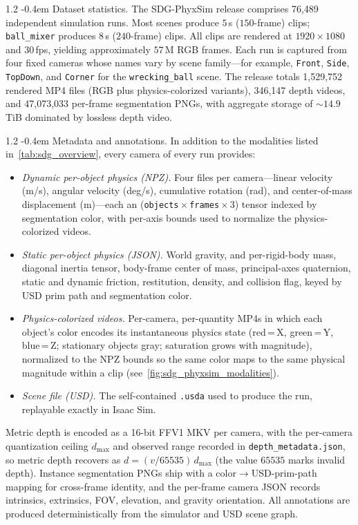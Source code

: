 \documentclass{llmxive}
\makeatletter
\providecommand{\paragraph}{  \@startsection{paragraph}{4}{\z@}    {1\baselineskip \@plus .2\baselineskip}    {-0.4em}    {\normalfont\normalsize\bfseries}}
\makeatother
\begin{document}
\paragraph{Dataset statistics.}
\label{appendix:sdg_phyxsim_dataset_statistics}
The SDG-PhyxSim release comprises 76{,}489 independent simulation
runs. Most scenes produce $5$\,s ($150$-frame) clips; \texttt{ball\_mixer}
produces $8$\,s ($240$-frame) clips. All clips are rendered at
$1920{\times}1080$ and $30$\,fps, yielding approximately $57$\,M RGB frames.
Each run is captured from four fixed cameras whose names vary by scene
family---for example, \texttt{Front}, \texttt{Side}, \texttt{TopDown},
and \texttt{Corner} for the \texttt{wrecking\_ball} scene. The release totals 1{,}529{,}752 rendered MP4 files (RGB plus
physics-colorized variants), 346{,}147 depth videos, and
47{,}073{,}033 per-frame segmentation PNGs, with aggregate storage of
${\sim}14.9$\,TiB dominated by lossless depth video.

\paragraph{Metadata and annotations.}
\label{appendix:sdg_phyxsim_metadata_annotations}
In addition to the modalities listed in~\cref{tab:sdg_overview}, every camera of every run provides:
\begin{itemize}
    \item \textit{Dynamic per-object physics (NPZ).} Four files per camera---linear velocity (m/s), angular velocity (deg/s), cumulative rotation (rad), and center-of-mass displacement (m)---each an (\texttt{objects}\,$\times$\,\texttt{frames}\,$\times$\,$3$) tensor indexed by segmentation color, with per-axis bounds used to normalize the physics-colorized videos.
    \item \textit{Static per-object physics (JSON).} World gravity, and per-rigid-body mass, diagonal inertia tensor, body-frame center of mass, principal-axes quaternion, static and dynamic friction, restitution, density, and collision flag, keyed by USD prim path and segmentation color.
    \item \textit{Physics-colorized videos.} Per-camera, per-quantity MP4s in which each object's color encodes its instantaneous physics state (red\,=\,X, green\,=\,Y, blue\,=\,Z; stationary objects gray; saturation grows with magnitude), normalized to the NPZ bounds so the same color maps to the same physical magnitude within a clip (see~\cref{fig:sdg_phyxsim_modalities}).
    \item \textit{Scene file (USD).} The self-contained \texttt{.usda} used to produce the run, replayable exactly in Isaac Sim.
\end{itemize}
Metric depth is encoded as a 16-bit FFV1 MKV per camera, with the per-camera quantization ceiling $d_{\max}$ and observed range recorded in \texttt{depth\_metadata.json}, so metric depth recovers as $d = (v/65535)\,d_{\max}$ (the value $65535$ marks invalid depth). Instance segmentation PNGs ship with a color$\rightarrow$USD-prim-path mapping for cross-frame identity, and the per-frame camera JSON records intrinsics, extrinsics, FOV, elevation, and gravity orientation. All annotations are produced deterministically from the simulator and USD scene graph.
\end{document}

